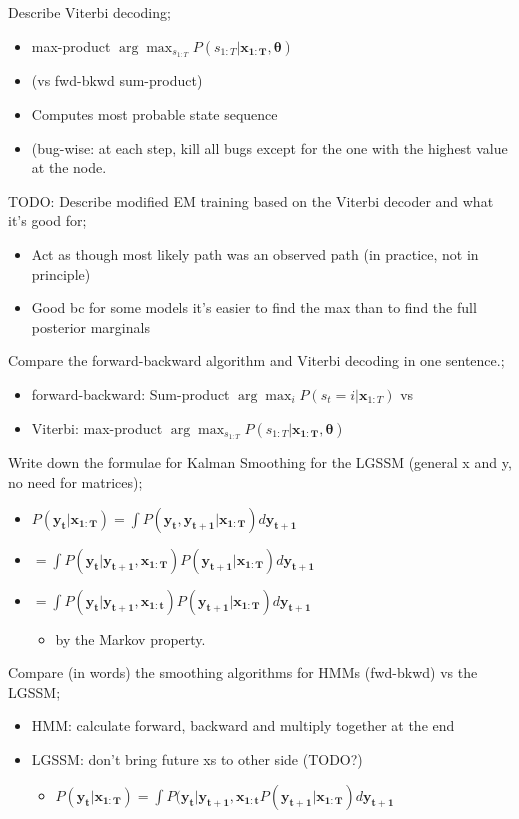 \documentclass{article}
\begin{document}
Describe Viterbi decoding; \begin{itemize} \item max-product $\arg\max_{s_{1:T}}P(s_{1:T}|\mathbf{x_{1:T},\theta})$  \item (vs fwd-bkwd sum-product) \item Computes most probable state sequence \item (bug-wise: at each step, kill all bugs except for the one with the highest value at the node. \end{itemize}

TODO: Describe modified EM training based on the Viterbi decoder and what it's good for; \begin{itemize} \item Act as though most likely path was an observed path (in practice, not in principle) \item Good bc for some models it's easier to find the max than to find the full posterior marginals \end{itemize}

Compare the forward-backward algorithm and Viterbi decoding in one sentence.; \begin{itemize} \item forward-backward: Sum-product $\arg\max_{i}P(s_t=i|\mathbf{x}_{1:T})$ vs \item Viterbi: max-product $\arg\max_{s_{1:T}}P(s_{1:T}|\mathbf{x_{1:T},\theta})$ \end{itemize}

Write down the formulae for Kalman Smoothing for the LGSSM (general x and y, no need for matrices); \begin{itemize} \item $P(\mathbf{y_t|x_{1:T}})=\int P(\mathbf{y_t, y_{t+1}|x_{1:T}})d\mathbf{y_{t+1}}$ \item $=\int P(\mathbf{y_t|y_{t+1},x_{1:T}})P(\mathbf{y_{t+1}|x_{1:T}}) d\mathbf{y_{t+1}}$ \item $=\int P(\mathbf{y_t|y_{t+1},x_{1:t}})P(\mathbf{y_{t+1}|x_{1:T}}) d\mathbf{y_{t+1}}$ \begin{itemize} \item by the Markov property. \end{itemize} \end{itemize}

Compare (in words) the smoothing algorithms for HMMs (fwd-bkwd) vs the LGSSM; \begin{itemize} \item HMM: calculate forward, backward and multiply together at the end \item LGSSM: don't bring future xs to other side (TODO?) \begin{itemize} \item  $P(\mathbf{y_t|x_{1:T}})=\int P(\mathbf{y_t|y_{t+1},x_{1:t}}P(\mathbf{y_{t+1}|x_{1:T}}) d\mathbf{y_{t+1}}$ \end{itemize} \end{itemize}
\end{document}
